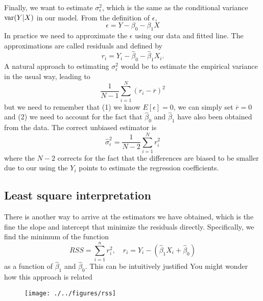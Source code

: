 Finally, we want to estimate $\sigma_{\epsilon}^2$, which is the same as the conditional variance ${\rm var}(Y|X)$ in our model. From the definition of $\epsilon$, 
\begin{equation}
\epsilon = Y - \beta_0 - \beta_1 X
\end{equation}
In practice we need to approximate the $\epsilon$ using our data and fitted line. The approximations are called residuals and defined by 
\begin{equation}
r_i = Y_i - \hat{\beta}_0 - \hat{\beta}_1 X_i. 
\end{equation}
A natural approach to estimating $\sigma_{\epsilon}^2$ would be to estimate the empirical variance in the usual way, leading to 
\begin{equation}
\frac{1}{N -1}\sum_{i=1}^N(r_i- \overline{r})^2
\end{equation}
but we need to remember that (1) we know $E[\epsilon]=0$, we can simply set $\overline{r}=0$ and (2) we need to account for the fact that $\hat{\beta}_0$ and $\hat{\beta}_1$ have also been obtained from the data. The correct unbiased estimator is 
\begin{equation}
\hat{\sigma}_{\epsilon}^2 = \frac{1}{N -2}\sum_{i=1}^Nr_i^2
\end{equation}
where the $N-2$ corrects for the fact that the differences are biased to be smaller due to our using the $Y_i$ points to estimate the regression coefficients. 


\subsection{Least square interpretation}

There is another way to arrive at the estimators we have obtained, which is the fine the slope and intercept that minimize the residuals directly. Specifically, we find the minimum of the function 
\begin{equation*}
RSS = \sum_{i=1}^n r_i^2,\quad r_i  = Y_i - (\hat{\beta}_1X_i + \hat{\beta}_0)
\end{equation*}
as a function of $\hat{\beta}_1$ and $\hat{\beta}_0$. This can be intuitively justified You might wonder how this approach is related 



\begin{figure}[h]
\centering
\texttt{[image: ./../figures/rss]}
\caption{ }\label{rss}
\end{figure}






